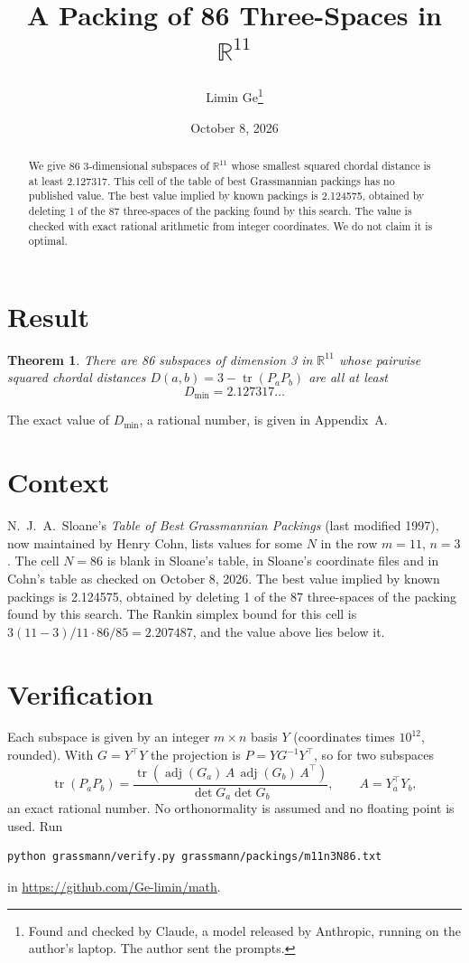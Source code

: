 \documentclass[11pt,a4paper]{article}
\title{A Packing of 86 Three-Spaces in $\mathbb{R}^{11}$}
\author{Limin Ge\thanks{Found and checked by Claude, a model released by Anthropic, running on the author's laptop. The author sent the prompts.}}
\date{October 8, 2026}
\newtheorem*{theorem}{Theorem}
\begin{document}
\maketitle
\begin{abstract}
We give 86 3-dimensional subspaces of $\mathbb{R}^{11}$ whose smallest squared chordal distance is at least 2.127317. This cell of the table of best Grassmannian packings has no published value. The best value implied by known packings is 2.124575, obtained by deleting 1 of the 87 three-spaces of the packing found by this search. The value is checked with exact rational arithmetic from integer coordinates. We do not claim it is optimal.
\end{abstract}

\section{Result}
\begin{theorem}
There are 86 subspaces of dimension 3 in $\mathbb{R}^{11}$ whose pairwise squared chordal distances $D(a,b) = 3 - \operatorname{tr}(P_aP_b)$ are all at least
\[ D_{\min} = 2.127317\ldots \]
\end{theorem}
The exact value of $D_{\min}$, a rational number, is given in Appendix~A.


\section{Context}
N.~J.~A.~Sloane's \emph{Table of Best Grassmannian Packings} (last modified 1997), now maintained by Henry Cohn, lists values for some $N$ in the row $m=11$, $n=3$. The cell $N=86$ is blank in Sloane's table, in Sloane's coordinate files and in Cohn's table as checked on October 8, 2026. The best value implied by known packings is 2.124575, obtained by deleting 1 of the 87 three-spaces of the packing found by this search. The Rankin simplex bound for this cell is $3(11-3)/11\cdot 86/85 = 2.207487$, and the value above lies below it.


\section{Verification}
Each subspace is given by an integer $m\times n$ basis $Y$ (coordinates times $10^{12}$, rounded). With $G=Y^\top Y$ the projection is $P=YG^{-1}Y^\top$, so for two subspaces
\[ \operatorname{tr}(P_aP_b)=\frac{\operatorname{tr}(\operatorname{adj}(G_a)\,A\,\operatorname{adj}(G_b)\,A^\top)}{\det G_a\det G_b},\qquad A=Y_a^\top Y_b, \]
an exact rational number. No orthonormality is assumed and no floating point is used. Run
\begin{verbatim}
python grassmann/verify.py grassmann/packings/m11n3N86.txt
\end{verbatim}
in \url{https://github.com/Ge-limin/math}.
\end{document}
